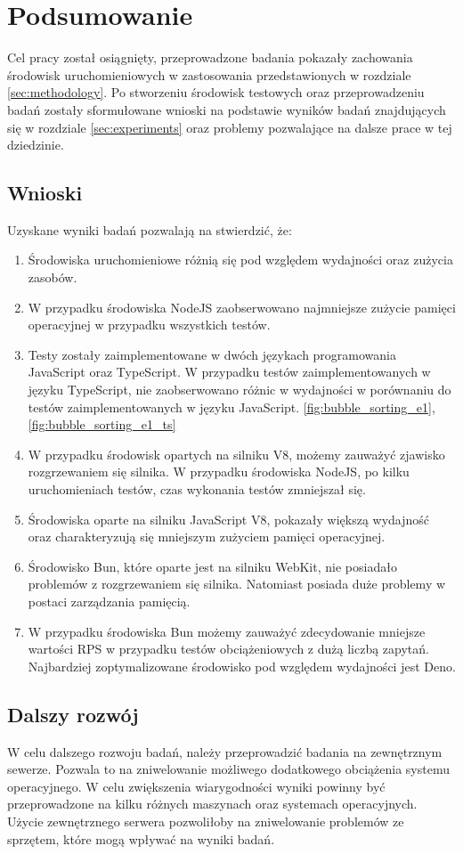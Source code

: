 \section{Podsumowanie}
Cel pracy został osiągnięty, przeprowadzone badania pokazały zachowania środowisk uruchomieniowych w zastosowania przedstawionych w rozdziale \ref{sec:methodology}. Po stworzeniu środowisk testowych oraz przeprowadzeniu badań zostały sformułowane wnioski na podstawie wyników badań znajdujących się w rozdziale \ref{sec:experiments} oraz problemy pozwalające na dalsze prace w tej dziedzinie.

\subsection{Wnioski}
Uzyskane wyniki badań pozwalają na stwierdzić, że:
\begin{enumerate}
  \item Środowiska uruchomieniowe różnią się pod względem wydajności oraz zużycia zasobów. 
  \item W przypadku środowiska NodeJS zaobserwowano najmniejsze zużycie pamięci operacyjnej w przypadku wszystkich testów.
  \item Testy zostały zaimplementowane w dwóch językach programowania JavaScript oraz TypeScript. W przypadku testów zaimplementowanych w języku TypeScript, nie zaobserwowano różnic w wydajności w porównaniu do testów zaimplementowanych w języku JavaScript. \ref{fig:bubble_sorting_e1}, \ref{fig:bubble_sorting_e1_ts}
  \item W przypadku środowisk opartych na silniku V8, możemy zauważyć zjawisko rozgrzewaniem się silnika. W przypadku środowiska NodeJS, po kilku uruchomieniach testów, czas wykonania testów zmniejszał się.
  \item Środowiska oparte na silniku JavaScript V8, pokazały większą wydajność oraz charakteryzują się mniejszym zużyciem pamięci operacyjnej.
  \item Środowisko Bun, które oparte jest na silniku WebKit, nie posiadało problemów z rozgrzewaniem się silnika. Natomiast posiada duże problemy w postaci zarządzania pamięcią.
  \item W przypadku środowiska Bun możemy zauważyć zdecydowanie mniejsze wartości RPS w przypadku testów obciążeniowych z dużą liczbą zapytań. Najbardziej zoptymalizowane środowisko pod względem wydajności jest Deno.
\end{enumerate}

\subsection{Dalszy rozwój}
W celu dalszego rozwoju badań, należy przeprowadzić badania na zewnętrznym sewerze. Pozwala to na zniwelowanie możliwego dodatkowego obciążenia systemu operacyjnego. W celu zwiększenia wiarygodności wyniki powinny być przeprowadzone na kilku różnych maszynach oraz systemach operacyjnych. Użycie zewnętrznego serwera pozwoliłoby na zniwelowanie problemów ze sprzętem, które mogą wpływać na wyniki badań.

